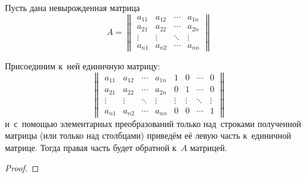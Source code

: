 \begin{theorem}
Пусть дана невырожденная матрица
\begin{equation*}
A =
\begin{Vmatrix}
a_{11} & a_{12} & \cdots & a_{1n} \\
a_{21} & a_{22} & \cdots & a_{2n} \\
\vdots & \vdots & \ddots & \vdots \\
a_{n1} & a_{n2} & \cdots & a_{nn}
\end{Vmatrix}
\end{equation*}

Присоединим к~ней единичную матрицу:
\begin{equation*}
\begin{Vmatrix}
a_{11} & a_{12} & \cdots & a_{1n} & 1 & 0 & \cdots & 0 \\
a_{21} & a_{22} & \cdots & a_{2n} & 0 & 1 & \cdots & 0 \\
\vdots & \vdots & \ddots & \vdots & \vdots & \vdots & \ddots & \vdots \\
a_{n1} & a_{n2} & \cdots & a_{nn} & 0 & 0 & \cdots & 1
\end{Vmatrix}
\end{equation*}
и~с~помощью элементарных преобразований только над~строками полученной матрицы (или только над столбцами) приведём её левую часть к~единичной матрице.
Тогда правая часть будет обратной к~$A$ матрицей.
\end{theorem}
\begin{proof}

\end{proof}